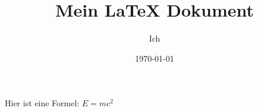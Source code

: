 \documentclass{article}
\title{Mein LaTeX Dokument}
\author{Ich}
\date{\today}
\begin{document}
\maketitle

Hier ist eine Formel: \( E = mc^2 \)
\end{document}
